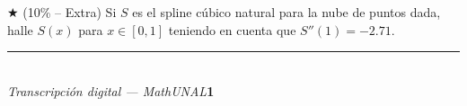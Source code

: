 \documentclass[11pt]{article}
\begin{document}
\vspace{5mm}
\noindent$\bigstar$ (10\% -- Extra) Si $S$ es el spline cúbico natural para la nube de puntos dada, halle $S(x)$ para $x\in[0,1]$ teniendo en cuenta que $S''(1)=-2.71$.

\vfill
\rule{\linewidth}{0.4pt}\\[1pt]
{\scriptsize\textit{Transcripción digital --- MathUNAL}\hfill\textcolor{unalblue}{\textbf{1}}}
\end{document}
